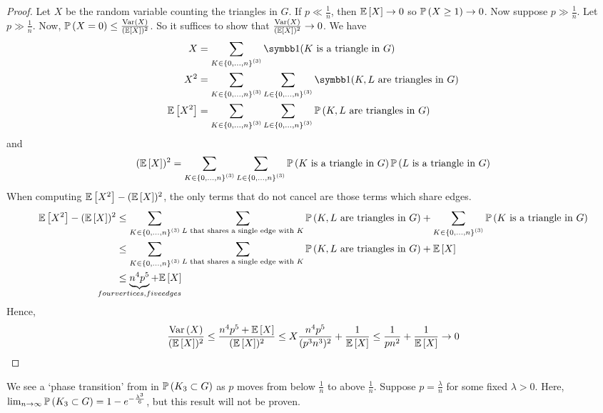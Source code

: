 \begin{proof}
	Let \( X \) be the random variable counting the triangles in \( G \).
	If \( p \ll \frac{1}{n} \), then \( \mathbb{E}\left[{X}\right] \to 0 \) so \( \mathbb{P}\left({X \geq 1}\right) \to 0 \).
	Now suppose \( p \gg \frac{1}{n} \).
	Let \( p \gg \frac{1}{n} \).
	Now, \( \mathbb{P}\left({X = 0}\right) \leq \frac{\operatorname{Var}\left({X}\right)}{(\mathbb{E}\left[{X}\right])^2} \).
	So it suffices to show that \( \frac{\operatorname{Var}\left({X}\right)}{(\mathbb{E}\left[{X}\right])^2} \to 0 \).
	We have
	\begin{align*}
		X &= \sum_{K \in \qty{0, \dots, n}^{(3)}} \symbb 1(K \text{ is a triangle in } G) \\
		X^2 &= \sum_{K \in \qty{0, \dots, n}^{(3)}} \sum_{L \in \qty{0, \dots, n}^{(3)}} \symbb 1(K, L \text{ are triangles in } G) \\
		\expect{X^2} &= \sum_{K \in \qty{0, \dots, n}^{(3)}} \sum_{L \in \qty{0, \dots, n}^{(3)}} \prob{K, L \text{ are triangles in } G}
	\end{align*}
	and
	\[ (\mathbb{E}\left[{X}\right])^2 = \sum_{K \in \qty{0, \dots, n}^{(3)}} \sum_{L \in \qty{0, \dots, n}^{(3)}} \mathbb{P}\left({K \text{ is a triangle in } G}\right) \mathbb{P}\left({L \text{ is a triangle in } G}\right) \]
	When computing \( \mathbb{E}\left[{X^2}\right] - (\mathbb{E}\left[{X}\right])^2 \), the only terms that do not cancel are those terms which share edges.
	\begin{align*}
		\expect{X^2} - (\expect{X})^2 &\leq \sum_{K \in \qty{0, \dots, n}^{(3)}} \sum_{L \text{ that shares a single edge with } K} \prob{K, L \text{ are triangles in } G} + \sum_{K \in \qty{0, \dots, n}^{(3)}} \prob{K \text{ is a triangle in } G} \\
		&\leq \sum_{K \in \qty{0, \dots, n}^{(3)}} \sum_{L \text{ that shares a single edge with } K} \prob{K, L \text{ are triangles in } G} + \expect{X} \\
		&\leq \underbrace{n^4 p^5}_{\mathclap{four vertices, five edges}} + \expect{X}
	\end{align*}
	Hence,
	\[ \frac{\operatorname{Var}\left({X}\right)}{(\mathbb{E}\left[{X}\right])^2} \leq \frac{n^4 p^5 + \mathbb{E}\left[{X}\right]}{(\mathbb{E}\left[{X}\right])^2} \leq X \frac{n^4 p^5}{(p^3 n^3)^2} + \frac{1}{\mathbb{E}\left[{X}\right]} \leq \frac{1}{pn^2} + \frac{1}{\mathbb{E}\left[{X}\right]} \to 0 \]
\end{proof}
\begin{remark}
	We see a `phase transition' from in \( \mathbb{P}\left({K_3 \subset G}\right) \) as \( p \) moves from below \( \frac{1}{n} \) to above \( \frac{1}{n} \).
	Suppose \( p = \frac{\lambda}{n} \) for some fixed \( \lambda > 0 \).
	Here, \( \lim_{n \to \infty} \mathbb{P}\left({K_3 \subset G}\right) = 1 - e^{-\frac{\lambda^3}{6}} \), but this result will not be proven.
\end{remark}
